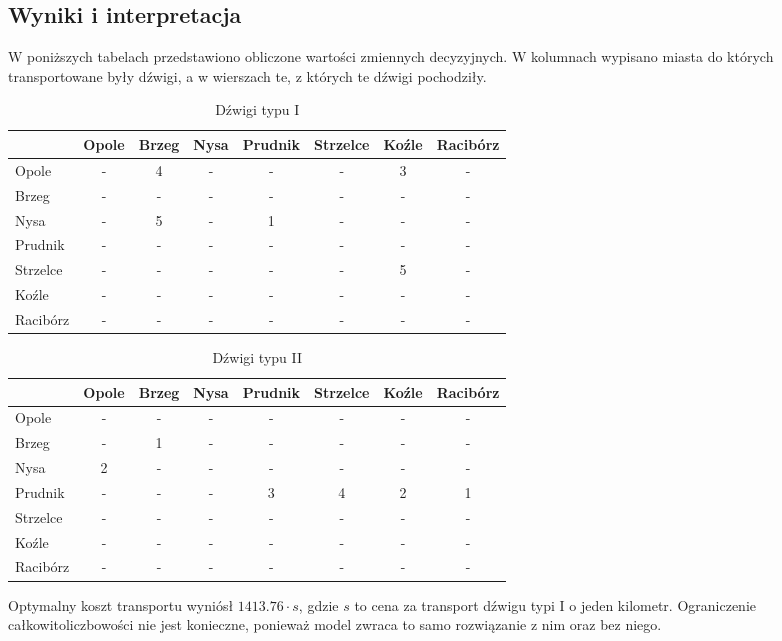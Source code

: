 \documentclass{article}
\begin{document}
\subsection{Wyniki i interpretacja}

W poniższych tabelach przedstawiono obliczone wartości zmiennych decyzyjnych. W kolumnach wypisano miasta do których transportowane były dźwigi, a w wierszach te, z których te dźwigi pochodziły.

\begin{table}[H]
\centering
\begin{tabular}{l|c c c c c c c}
 & Opole & Brzeg & Nysa & Prudnik & Strzelce & Koźle & Racibórz\\\hline
Opole & - & 4 & - & - & - & 3 & -\\\hline
Brzeg & - & - & - & - & - & - & -\\\hline
Nysa & - & 5 & - & 1 & - & - & -\\\hline
Prudnik & - & - & - & - & - & - & -\\\hline
Strzelce & - & - & - & - & - & 5 & -\\\hline
Koźle & - & - & - & - & - & - & -\\\hline
Racibórz & - & - & - & - & - & - & -\\\hline
\end{tabular}
\caption{Dźwigi typu I}
\end{table}

\begin{table}[H]
\centering
\begin{tabular}{l|c c c c c c c}
 & Opole & Brzeg & Nysa & Prudnik & Strzelce & Koźle & Racibórz\\\hline
Opole & - & - & - & - & - & - & -\\\hline
Brzeg & - & 1 & - & - & - & - & -\\\hline
Nysa & 2 & - & - & - & - & - & -\\\hline
Prudnik & - & - & - & 3 & 4 & 2 & 1\\\hline
Strzelce & - & - & - & - & - & - & -\\\hline
Koźle & - & - & - & - & - & - & -\\\hline
Racibórz & - & - & - & - & - & - & -\\\hline
\end{tabular}
\caption{Dźwigi typu II}
\end{table}

Optymalny koszt transportu wyniósł $1413.76 \cdot s$, gdzie $s$ to cena za transport dźwigu typi I o jeden kilometr.
Ograniczenie całkowitoliczbowości nie jest konieczne, ponieważ model zwraca to samo rozwiązanie z nim oraz bez niego.
\end{document}
